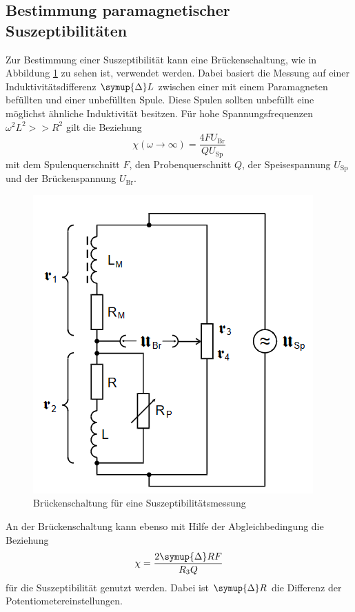 \subsection{Bestimmung paramagnetischer Suszeptibilitäten}
Zur Bestimmung einer Suszeptibilität kann eine Brückenschaltung, wie in Abbildung \ref{fig:sus} zu sehen ist, verwendet werden. 
Dabei basiert die Messung auf einer Induktivitätsdifferenz $\symup{\Delta}L$ zwischen einer mit einem Paramagneten befüllten und einer unbefüllten Spule.
Diese Spulen sollten unbefüllt eine möglichst ähnliche Induktivität besitzen.
Für hohe Spannungsfrequenzen $\omega^2 L^2 >> R^2$ gilt die Beziehung
\begin{equation}
    \chi\left(\omega \to \infty \right) =\frac{4 F U_\text{Br}}{Q U_\text{Sp}}
    \label{eqn:chil}
\end{equation}
mit dem Spulenquerschnitt $F$, den Probenquerschnitt $Q$, der Speisespannung $U_\text{Sp}$ und der Brückenspannung $U_\text{Br}$.
\begin{figure}
    \centering
    \includegraphics[scale=0.4]{pics/sus.png}
    \caption{Brückenschaltung für eine Suszeptibilitätsmessung \cite{v606}}
    \label{fig:sus}
  \end{figure}
An der Brückenschaltung kann ebenso mit Hilfe der Abgleichbedingung die Beziehung
\begin{equation}
    \chi = \frac{2 \symup{\Delta}R F}{R_3 Q}
    \label{eqn:chir}
\end{equation}
für die Suszeptibilität genutzt werden. Dabei ist $\symup{\Delta}R$ die Differenz der Potentiometereinstellungen.
